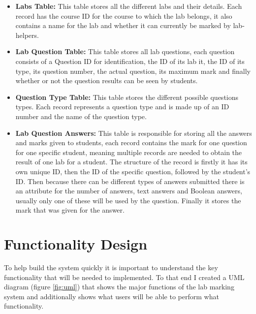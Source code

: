\documentclass[11pt]{report}
\begin{document}
\begin{itemize}
    \item \textbf{Labs Table:} This table stores all the different labs and their details. Each record has the course ID for the course  to which the lab belongs, it also contains a name for the lab and whether it can currently be marked by lab-helpers.  
    
    \item \textbf{Lab Question Table:} This table stores all lab questions, each question consists of a Question ID for identification, the ID of its lab it, the ID of its type, its question number, the actual question, its maximum mark  and finally whether or not the question results can be seen by students.
    
    \item \textbf{Question Type Table:} This table stores the different possible questions types. Each record represents a question type and is made up of an ID number and the name of the question type.
    
    \item \textbf{Lab Question Answers:} This table is responsible for storing all the answers and marks given to students, each record contains the mark for one question for one specific student, meaning multiple records are needed to obtain the result of one lab for a student. The structure of the record is firstly it has its own unique ID, then the ID of the specific question, followed by the student's ID. Then because there can be different types of answers submitted there is an attribute for the number of answers, text answers and Boolean answers, usually only one of these will be used by the question. Finally it stores the mark that was given for the answer.
\end{itemize}


\section{Functionality Design}

To help build the system quickly it is important to understand the key functionality that will be needed to implemented. To that end I created a UML diagram (figure \ref{fig:uml}) that shows the major functions of the lab marking system and additionally shows what users will be able to perform what functionality.
\end{document}
